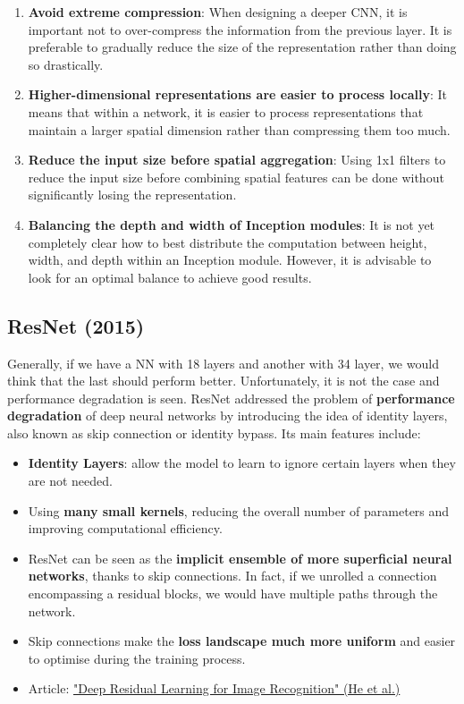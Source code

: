 \begin{enumerate}
    \item \textbf{Avoid extreme compression}: When designing a deeper CNN, it is important not to over-compress the information from the previous layer. It is preferable to gradually reduce the size of the representation rather than doing so drastically.

    \item \textbf{Higher-dimensional representations are easier to process locally}: It means that within a network, it is easier to process representations that maintain a larger spatial dimension rather than compressing them too much.

    \item \textbf{Reduce the input size before spatial aggregation}: Using 1x1 filters to reduce the input size before combining spatial features can be done without significantly losing the representation.

    \item \textbf{Balancing the depth and width of Inception modules}: It is not yet completely clear how to best distribute the computation between height, width, and depth within an Inception module. However, it is advisable to look for an optimal balance to achieve good results.
\end{enumerate}

\subsection{ResNet (2015)}

Generally, if we have a NN with 18 layers and another with 34 layer, we would think that the last should perform better. Unfortunately, it is not the case and performance degradation is seen. ResNet addressed the problem of \textbf{performance degradation} of deep neural networks by introducing the idea of identity layers, also known as skip connection or identity bypass. Its main features include:
\begin{itemize}
    \item \textbf{Identity Layers}: allow the model to learn to ignore certain layers when they are not needed.
    \item Using \textbf{many small kernels}, reducing the overall number of parameters and improving computational efficiency.
    \item ResNet can be seen as the \textbf{implicit ensemble of more superficial neural networks}, thanks to skip connections. In fact, if we unrolled a connection encompassing a residual blocks, we would have multiple paths through the network.
    \item Skip connections make the \textbf{loss landscape much more uniform} and easier to optimise during the training process.
    \item Article: \href{https://arxiv.org/pdf/1512.03385.pdf}{"Deep Residual Learning for Image Recognition" (He et al.)}
\end{itemize}

